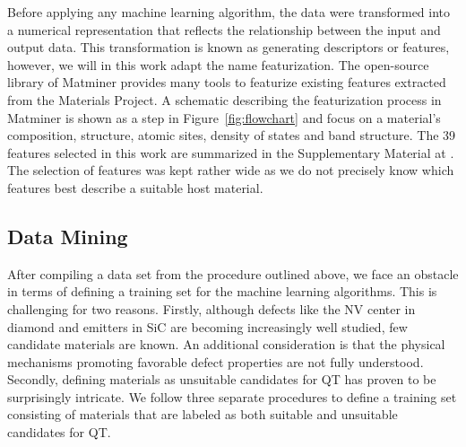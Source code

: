 \documentclass[superscriptaddress,unsortedaddress,
 amsmath,amssymb,
 aps,
]{revtex4-2}
\begin{document}
Before applying any machine learning algorithm, the data were transformed into a numerical representation that reflects the relationship between the input and output data. This transformation is known as generating descriptors
or features, however, we will in this work adapt the name featurization.
The open-source library of Matminer provides many tools to featurize existing features extracted from the Materials Project.
A schematic describing the  featurization process in Matminer is shown as a step in Figure~\ref{fig:flowchart} 
and focus on a material's composition, structure, atomic sites, density of states and band structure. 
The 39 features selected in this work are summarized in the Supplementary Material at \cite{supplementary}. The selection of features was kept rather wide as we do not precisely know which features best describe a suitable  host material. 

\subsection*{Data Mining}

After compiling a data set from the procedure outlined above, we face an obstacle in terms of defining a training set for the machine learning algorithms. This is challenging for two reasons. 
Firstly, although defects like the NV center in diamond and emitters in SiC are becoming
increasingly well studied, few candidate materials are known. An additional consideration
is that the physical mechanisms promoting favorable defect properties are not fully understood. Secondly, defining materials as unsuitable candidates for QT has proven to be surprisingly intricate. 
We follow three separate procedures to define a training set consisting of materials that are labeled as both suitable and unsuitable candidates for QT. 
\end{document}
